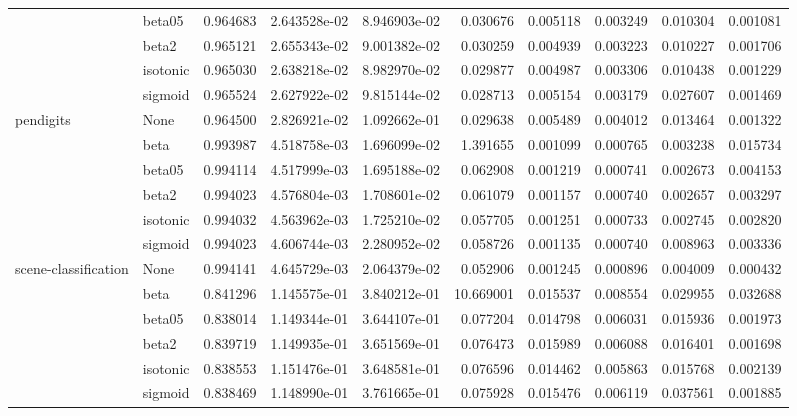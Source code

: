 \begin{tabular}{llrrrrrrrr}
        & beta05 &  0.964683 &  2.643528e-02 &  8.946903e-02 &   0.030676 &  0.005118 &  0.003249 &  0.010304 &  0.001081 \\
        & beta2 &  0.965121 &  2.655343e-02 &  9.001382e-02 &   0.030259 &  0.004939 &  0.003223 &  0.010227 &  0.001706 \\
        & isotonic &  0.965030 &  2.638218e-02 &  8.982970e-02 &   0.029877 &  0.004987 &  0.003306 &  0.010438 &  0.001229 \\
        & sigmoid &  0.965524 &  2.627922e-02 &  9.815144e-02 &   0.028713 &  0.005154 &  0.003179 &  0.027607 &  0.001469 \\
pendigits & None &  0.964500 &  2.826921e-02 &  1.092662e-01 &   0.029638 &  0.005489 &  0.004012 &  0.013464 &  0.001322 \\
        & beta &  0.993987 &  4.518758e-03 &  1.696099e-02 &   1.391655 &  0.001099 &  0.000765 &  0.003238 &  0.015734 \\
        & beta05 &  0.994114 &  4.517999e-03 &  1.695188e-02 &   0.062908 &  0.001219 &  0.000741 &  0.002673 &  0.004153 \\
        & beta2 &  0.994023 &  4.576804e-03 &  1.708601e-02 &   0.061079 &  0.001157 &  0.000740 &  0.002657 &  0.003297 \\
        & isotonic &  0.994032 &  4.563962e-03 &  1.725210e-02 &   0.057705 &  0.001251 &  0.000733 &  0.002745 &  0.002820 \\
        & sigmoid &  0.994023 &  4.606744e-03 &  2.280952e-02 &   0.058726 &  0.001135 &  0.000740 &  0.008963 &  0.003336 \\
scene-classification & None &  0.994141 &  4.645729e-03 &  2.064379e-02 &   0.052906 &  0.001245 &  0.000896 &  0.004009 &  0.000432 \\
        & beta &  0.841296 &  1.145575e-01 &  3.840212e-01 &  10.669001 &  0.015537 &  0.008554 &  0.029955 &  0.032688 \\
        & beta05 &  0.838014 &  1.149344e-01 &  3.644107e-01 &   0.077204 &  0.014798 &  0.006031 &  0.015936 &  0.001973 \\
        & beta2 &  0.839719 &  1.149935e-01 &  3.651569e-01 &   0.076473 &  0.015989 &  0.006088 &  0.016401 &  0.001698 \\
        & isotonic &  0.838553 &  1.151476e-01 &  3.648581e-01 &   0.076596 &  0.014462 &  0.005863 &  0.015768 &  0.002139 \\
        & sigmoid &  0.838469 &  1.148990e-01 &  3.761665e-01 &   0.075928 &  0.015476 &  0.006119 &  0.037561 &  0.001885 \\

\end{tabular}
